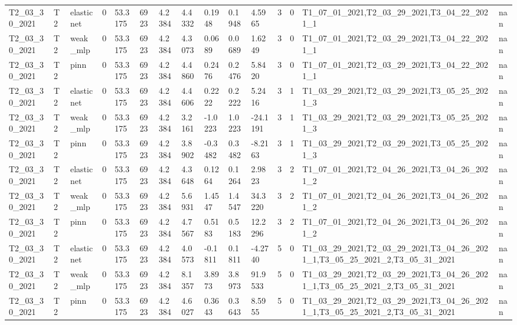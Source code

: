 \begin{table}[t]
\begin{tabular}{lllllllllllllll}
T2\_03\_30\_2021 & T2 & elasticnet & 0 & 53.3175 & 6923 & 4.2384 & 4.4332 & 0.1948 & 0.1948 & 4.5965 & 3 & 0 & T1\_07\_01\_2021,T2\_03\_29\_2021,T3\_04\_22\_2021\_1 & nan \\
T2\_03\_30\_2021 & T2 & weak\_mlp & 0 & 53.3175 & 6923 & 4.2384 & 4.3073 & 0.0689 & 0.0689 & 1.6249 & 3 & 0 & T1\_07\_01\_2021,T2\_03\_29\_2021,T3\_04\_22\_2021\_1 & nan \\
T2\_03\_30\_2021 & T2 & pinn & 0 & 53.3175 & 6923 & 4.2384 & 4.4860 & 0.2476 & 0.2476 & 5.8420 & 3 & 0 & T1\_07\_01\_2021,T2\_03\_29\_2021,T3\_04\_22\_2021\_1 & nan \\
T2\_03\_30\_2021 & T2 & elasticnet & 0 & 53.3175 & 6923 & 4.2384 & 4.4606 & 0.2222 & 0.2222 & 5.2416 & 3 & 1 & T1\_03\_29\_2021,T2\_03\_29\_2021,T3\_05\_25\_2021\_3 & nan \\
T2\_03\_30\_2021 & T2 & weak\_mlp & 0 & 53.3175 & 6923 & 4.2384 & 3.2161 & -1.0223 & 1.0223 & -24.1191 & 3 & 1 & T1\_03\_29\_2021,T2\_03\_29\_2021,T3\_05\_25\_2021\_3 & nan \\
T2\_03\_30\_2021 & T2 & pinn & 0 & 53.3175 & 6923 & 4.2384 & 3.8902 & -0.3482 & 0.3482 & -8.2163 & 3 & 1 & T1\_03\_29\_2021,T2\_03\_29\_2021,T3\_05\_25\_2021\_3 & nan \\
T2\_03\_30\_2021 & T2 & elasticnet & 0 & 53.3175 & 6923 & 4.2384 & 4.3648 & 0.1264 & 0.1264 & 2.9823 & 3 & 2 & T1\_07\_01\_2021,T2\_04\_26\_2021,T3\_04\_26\_2021\_2 & nan \\
T2\_03\_30\_2021 & T2 & weak\_mlp & 0 & 53.3175 & 6923 & 4.2384 & 5.6931 & 1.4547 & 1.4547 & 34.3220 & 3 & 2 & T1\_07\_01\_2021,T2\_04\_26\_2021,T3\_04\_26\_2021\_2 & nan \\
T2\_03\_30\_2021 & T2 & pinn & 0 & 53.3175 & 6923 & 4.2384 & 4.7567 & 0.5183 & 0.5183 & 12.2296 & 3 & 2 & T1\_07\_01\_2021,T2\_04\_26\_2021,T3\_04\_26\_2021\_2 & nan \\
T2\_03\_30\_2021 & T2 & elasticnet & 0 & 53.3175 & 6923 & 4.2384 & 4.0573 & -0.1811 & 0.1811 & -4.2740 & 5 & 0 & T1\_03\_29\_2021,T2\_03\_29\_2021,T3\_04\_26\_2021\_1,T3\_05\_25\_2021\_2,T3\_05\_31\_2021 & nan \\
T2\_03\_30\_2021 & T2 & weak\_mlp & 0 & 53.3175 & 6923 & 4.2384 & 8.1357 & 3.8973 & 3.8973 & 91.9533 & 5 & 0 & T1\_03\_29\_2021,T2\_03\_29\_2021,T3\_04\_26\_2021\_1,T3\_05\_25\_2021\_2,T3\_05\_31\_2021 & nan \\
T2\_03\_30\_2021 & T2 & pinn & 0 & 53.3175 & 6923 & 4.2384 & 4.6027 & 0.3643 & 0.3643 & 8.5955 & 5 & 0 & T1\_03\_29\_2021,T2\_03\_29\_2021,T3\_04\_26\_2021\_1,T3\_05\_25\_2021\_2,T3\_05\_31\_2021 & nan \\

\end{tabular}
\end{table}
